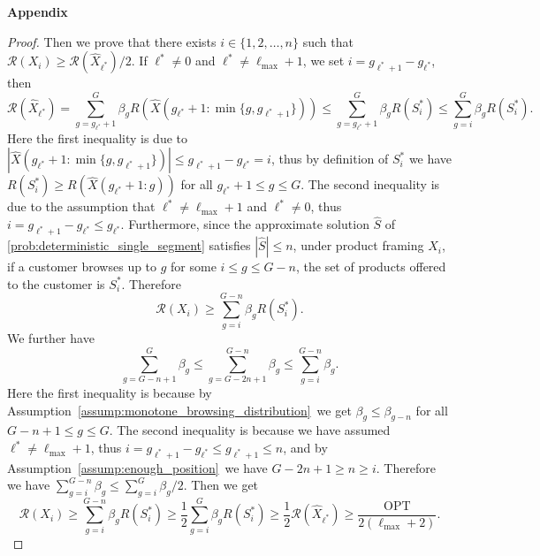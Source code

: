 \documentclass[msom,non-blindrev]{informs3} %
\theoremstyle{definition}
\begin{document}
\begin{appendices}{\Large \noindent\textbf{Appendix}}
{\begin{proof}
Then we prove that there exists $i\in\{1,2,\dots,n\}$ such that $\mathcal{R}(X_i)\geq \mathcal{R}(\hat{X}_{\ell^*})/2$. If $\ell^*\neq 0$ and $\ell^*\neq \ell_{\max}+1$, we set $i=g_{\ell^*+1}-g_{\ell^*}$, then
\begin{equation*}
\mathcal{R}(\hat{X}_{\ell^*})=\sum_{g=g_{\ell^*}+1}^{G}\beta_g R(\hat{X}(g_{\ell^*}+1:\min\{g,g_{\ell^*+1}\}))\leq \sum_{g=g_{\ell^*}+1}^{G}\beta_g R(S_i^*)\leq \sum_{g=i}^G\beta_gR(S_i^*).
\end{equation*}
Here the first inequality is due to $|\hat{X}(g_{\ell^*}+1:\min\{g,g_{\ell^*+1}\})|\leq g_{\ell^*+1}-g_{\ell^*}=i$, thus by definition of $S_i^*$ we have $R(S_i^*)\geq R(\hat{X}(g_{\ell^*}+1:g))$ for all $g_{\ell^*}+1\leq g\leq G$. The second inequality is due to the assumption that $\ell^*\neq \ell_{\max}+1$ and $\ell^*\neq 0$, thus $i=g_{\ell^*+1}-g_{\ell^*}\leq g_{\ell^*}$. Furthermore, since the approximate solution $\hat{S}$ of \eqref{prob:deterministic_single_segment} satisfies $|\hat{S}|\leq n$, under product framing $X_i$, if a customer browses up to $g$ for some $i\leq g\leq G-n$, the set of products offered to the customer is $S_i^*$. Therefore
\begin{equation*}
\mathcal{R}(X_i)\geq \sum_{g=i}^{G-n}\beta_g R(S_i^*).
\end{equation*}
We further have
\begin{equation*}
\sum_{g=G-n+1}^G \beta_g\leq \sum_{g=G-2n+1}^{G-n}\beta_g\leq \sum_{g=i}^{G-n}\beta_g.
\end{equation*}
Here the first inequality is because by Assumption~\ref{assump:monotone_browsing_distribution}~we get $\beta_g\leq \beta_{g-n}$ for all $G-n+1\leq g\leq G$. The second inequality is because we have assumed $\ell^*\neq \ell_{\max}+1$, thus $i=g_{\ell^*+1}-g_{\ell^*}\leq g_{\ell^*+1}\leq n$, and by Assumption~\ref{assump:enough_position}~we have $G-2n+1\geq n\geq i$. Therefore we have $\sum_{g=i}^{G-n}\beta_g\leq \sum_{g=i}^G\beta_g/2$. Then we get
\begin{equation*}
\mathcal{R}(X_i)\geq \sum_{g=i}^{G-n}\beta_g R(S_i^*)\geq \dfrac{1}{2}\sum_{g=i}^G \beta_gR(S_i^*)\geq \dfrac{1}{2}\mathcal{R}(\hat{X}_{\ell^*})\geq \dfrac{\text{OPT}}{2(\ell_{\max}+2)}.
\end{equation*}


\end{proof}}
\end{appendices}
\end{document}

